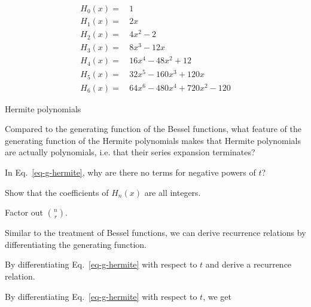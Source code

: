 \begin{table}
\begin{align}
H_0(x) = & \, 1 \nonumber \\
H_1(x) = & \, 2x \nonumber \\
H_2(x) = & \, 4x^2-2 \nonumber \\
H_3(x) = & \, 8x^3-12x \nonumber \\
H_4(x) = & \, 16x^4-48x^2+12 \nonumber \\
H_5(x) = & \, 32x^5-160x^3+120x \nonumber \\
H_6(x) = & \, 64x^6-480x^4+720x^2-120 \nonumber
\end{align}
\caption{Hermite polynomials}
\label{tab-hermite}
\end{table}

\pagebreak

\begin{exer}
Compared to the generating function of the Bessel functions, what feature of the generating function of the Hermite polynomials makes that Hermite polynomials are actually polynomials, i.e. that their series expansion terminates?
\end{exer}

\begin{exer}
In Eq.~\ref{eq-g-hermite}, why are there no terms for negative powers of $t$?
\end{exer}

\begin{exer}
Show that the coefficients of $H_n(x)$ are all integers.
\begin{hnt}
Factor out $n \choose r$.  
\end{hnt}
\end{exer}

\pagebreak


\label{week5}

Similar to the treatment of Bessel functions, we can derive recurrence relations by differentiating the generating function.

\begin{cue}
By differentiating Eq.~\ref{eq-g-hermite} with respect to $t$ and derive a recurrence relation.
\end{cue}
 
By differentiating Eq.~\ref{eq-g-hermite} with respect to $t$, we get

